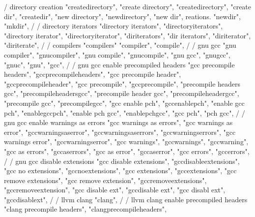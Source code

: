         / directory creation
        "createdirectory",  
        "create directory",  
        "createdirectory",  
        "create dir",  
        "createdir",  
        "new directory",  
        "newdirectory",  
        "new dir", reations. 
        "newdir",  
        "mkdir",  
        /
        / directory iterators 
        "directory iterators",  
        "directoryiterators",  
        "directory iterator",  
        "directoryiterator",  
        "diriterators",  
        "dir iterators",  
        "diriterator",  
        "diriterate",  
        /
        / compilers 
        "compilers"
        "compiler",
        "compile",
        /
        / gnu gcc
        "gnu compiler",
        "gnucompiler",
        "gnu compile",
        "gnucompile",
        "gnu gcc",
        "gnugcc",
        "gnuc",
        "gnu",
        "gcc",
        /
        / gnu gcc enable precompiled headers
        "gcc precompile headers",  
        "gccprecompileheaders",  
        "gcc precompile header",  
        "gccprecompileheader",  
        "gcc precompile",  
        "gccprecompile",  
        "precompile headers gcc",  
        "precompileheadersgcc",  
        "precompile header gcc",  
        "precompileheadergcc",  
        "precompile gcc",  
        "precompilegcc",  
        "gcc enable pch",  
        "gccenablepch",  
        "enable gcc pch",  
        "enablegccpch",  
        "enable pch gcc",  
        "enablepchgcc",  
        "gcc pch",  
        "pch gcc",  
        /
        / gnu gcc enable warnings as errors
        "gcc warnings as errors", 
        "gcc warnings as error", 
        "gccwarningsaserror", 
        "gccwarningsaserrors", 
        "gccwarningserrors", 
        "gcc warnings error", 
        "gccwarningserror", 
        "gcc warnings", 
        "gccwarnings", 
        "gccwarning", 
        "gcc as errors", 
        "gccaserrors", 
        "gcc as error", 
        "gccaserror", 
        "gcc errors", 
        "gccerrors", 
        /
        / gnu gcc disable extensions 
        "gcc disable extensions", 
        "gccdisableextensions", 
        "gcc no extensions", 
        "gccnoextensions", 
        "gcc extensions", 
        "gccextensions", 
        "gcc remove extensions", 
        "gcc remove extension", 
        "gccremoveextensions", 
        "gccremoveextension", 
        "gcc disable ext", 
        "gccdisable ext", 
        "gcc disabl ext", 
        "gccdisablext", 
        /
        / llvm clang 
        "clang",  
        /
        / llvm clang enable precompiled headers 
        "clang precompile headers",  
        "clangprecompileheaders",  
